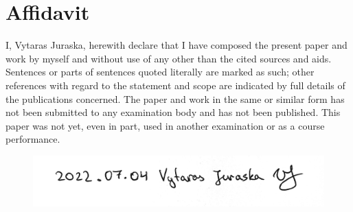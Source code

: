 \documentclass[11pt,a4paper,footinclude=true,headinclude=true, oneside]{scrbook}
\begin{document}

\chapter{Affidavit}
I, Vytaras Juraska, herewith declare that I have composed the present paper and work by myself and without use of any other than the cited sources and aids. Sentences or parts of sentences quoted literally are marked as such; other references with regard to the statement and scope are indicated by full details of the publications concerned. The paper and work in the same or similar form has not been submitted to any examination body and has not been published. This paper was not yet, even in part, used in another examination or as a course performance.

\begin{figure}[H]
\hspace*{3.5cm}
\centerline{\includegraphics[scale=1]{Signature.png}}
\end{figure}
\end{document}
